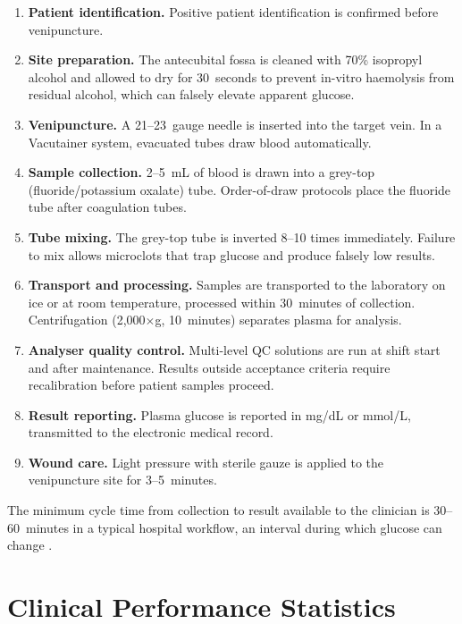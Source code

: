 \begin{enumerate}
  \item \textbf{Patient identification.} Positive patient identification is confirmed before venipuncture.
  \item \textbf{Site preparation.} The antecubital fossa is cleaned with 70\% isopropyl alcohol and allowed to dry for 30~seconds to prevent in-vitro haemolysis from residual alcohol, which can falsely elevate apparent glucose.
  \item \textbf{Venipuncture.} A 21--23~gauge needle is inserted into the target vein. In a Vacutainer system, evacuated tubes draw blood automatically.
  \item \textbf{Sample collection.} 2--5~mL of blood is drawn into a grey-top (fluoride/potassium oxalate) tube. Order-of-draw protocols place the fluoride tube after coagulation tubes.
  \item \textbf{Tube mixing.} The grey-top tube is inverted 8--10 times immediately. Failure to mix allows microclots that trap glucose and produce falsely low results.
  \item \textbf{Transport and processing.} Samples are transported to the laboratory on ice or at room temperature, processed within 30~minutes of collection. Centrifugation (2,000$\times$g, 10~minutes) separates plasma for analysis.
  \item \textbf{Analyser quality control.} Multi-level QC solutions are run at shift start and after maintenance. Results outside acceptance criteria require recalibration before patient samples proceed.
  \item \textbf{Result reporting.} Plasma glucose is reported in mg/dL or mmol/L, transmitted to the electronic medical record.
  \item \textbf{Wound care.} Light pressure with sterile gauze is applied to the venipuncture site for 3--5~minutes.
\end{enumerate}

The minimum cycle time from collection to result available to the clinician is 30--60~minutes in a typical hospital workflow, an interval during which glucose can change .

\section{Clinical Performance Statistics}

